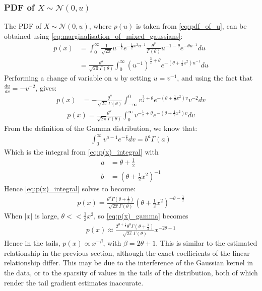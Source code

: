 \documentclass[a4paper]{article}
\begin{document}
\subsubsection{PDF of $X \sim \mathcal{N}(0, u)$}
The PDF of $X \sim \mathcal{N}(0, u)$, where $p(u)$ is taken from \autoref{eq:pdf_of_u}, can be obtained using
\autoref{eq:marginalisation_of_mixed_gaussians}:
\begin{align*}
    p(x) &= \int_0^\infty \frac{1}{\sqrt{2\pi}} u^{-\frac{1}{2}} e^{-\frac{1}{2} x^2 u^{-1}}
    \frac{\theta^{\theta}}{\Gamma(\theta)} u^{-1-\theta} e^{-\theta u^{-1}} du \\
    &= \frac{\theta^{\theta}}{\sqrt{2\pi} \Gamma(\theta)}
    \int_0^\infty \left( u^{-1} \right) ^ {\frac{3}{2} + \theta} e^{-\left( \theta + \frac{1}{2} x^2 \right) u^{-1}} du
\end{align*}
Performing a change of variable on $u$ by setting $u = v^{-1}$, and using the fact that $\frac{du}{dv} = -v^{-2}$,
gives:
\begin{align*}
    p(x) &= - \frac{\theta^{\theta}}{\sqrt{2\pi} \Gamma(\theta)}
    \int_{-\infty}^0 v ^ {\frac{3}{2} + \theta} e^{-\left( \theta + \frac{1}{2} x^2 \right) v} v^{-2} dv
\end{align*}
\begin{align}\label{eq:p(x)_integral}
    p(x) = \frac{\theta^{\theta}}{\sqrt{2\pi} \Gamma(\theta)}
    \int_0^\infty v ^ {-\frac{1}{2} + \theta} e^{-\left( \theta + \frac{1}{2} x^2 \right) v} dv
\end{align}
From the definition of the Gamma distribution, we know that:
\begin{align*}
    \int_0^\infty v ^ {a - 1} e^{-\frac{v}{b}} dv = b^a \Gamma(a)
\end{align*}
Which is the integral from \autoref{eq:p(x)_integral} with
\begin{align*}
    a &= \theta + \frac{1}{2} \\
    b &= \left(\theta + \frac{1}{2} x^2 \right) ^ {-1}
\end{align*}
Hence \autoref{eq:p(x)_integral} solves to become:
\begin{align}\label{eq:p(x)_gamma}
    p(x) = \frac{\theta^{\theta} \Gamma\left(\theta + \frac{1}{2} \right)}{\sqrt{2\pi} \Gamma(\theta)}
    \left( \theta + \frac{1}{2}x^2 \right)^{-\theta - \frac{1}{2}}
\end{align}
When $|x|$ is large, $\theta << \frac{1}{2} x^2$, so \autoref{eq:p(x)_gamma} becomes
\begin{align}
    p(x) \approx \frac{2^{\theta + \frac{1}{2}} \theta^{\theta} \Gamma\left(\theta + \frac{1}{2} \right)}{\sqrt{2\pi} \Gamma(\theta)}
    x ^{-2\theta - 1}
\end{align}
Hence in the tails, $p(x) \propto x^{-\beta}$, with $\beta = 2\theta + 1$.
This is similar to the estimated relationship in the previous section, although the exact coefficients of the linear
relationship differ. This may be due to the interference of the Gaussian kernel in the data, or to the sparsity of
values in the tails of the distribution, both of which render the tail gradient estimates inaccurate.
\end{document}
